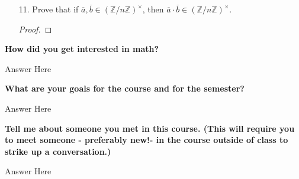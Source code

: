 \documentclass[10pt]{article}
\newcommand{\bb}[1]{\mathbb{#1}} %
\newcommand{\Z}{\bb{Z}} %
\newcommand{\obar}[1]{\overline{#1}} %
\begin{document}
    \begin{itemize}
        \item[11.]Prove that if \(\obar{a},\obar{b}\in(\Z/n\Z)^\times\), then \(\obar{a}\cdot\obar{b}\in(\Z/n\Z)^\times\).

        \begin{proof}
        \end{proof}
        
    \end{itemize}

    \noindent\textbf{How did you get interested in math?}

    Answer Here

    \vspace{5pt}

    \noindent\textbf{What are your goals for the course and for the semester?}

    Answer Here

    \vspace{5pt}

    \noindent\textbf{Tell me about someone you met in this course. (This will require you to meet someone - preferably new!- in the course outside of class to strike up a conversation.)}

    Answer Here
\end{document}
